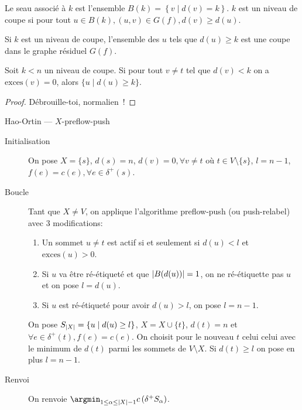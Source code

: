 \documentclass[math, info]{cours}
\begin{document}
\begin{definition}
	Le seau associé à $k$ est l'ensemble $B(k) = \left\{v \mid d(v) = k\right\}$.
	$k$ est un niveau de coupe si pour tout $u \in B(k), (u, v) \in G(f), d(v) \geq d(u)$.
	\label{def:bucketlevel}
\end{definition}

\begin{proposition}
	Si $k$ est un niveau de coupe, l'ensemble des $u$ tels que $d(u) \geq k$ est une coupe dans le graphe résiduel $G(f)$.
	\label{prop:cutleveliscut}
\end{proposition}

\begin{proposition}
	Soit $k < n$ un niveau de coupe. Si pour tout $v \neq t$ tel que $d(v) < k$ on a $\mathrm{exces}(v) = 0$, alors $\{u \mid d(u) \geq k\}$.
	\label{prop:cutlevelexcess}
\end{proposition}
\begin{proof}
	Débrouille-toi, normalien~!
\end{proof}

\begin{algorithm}
	\caption{Hao-Ortin --- $X$-preflow-push}
	\begin{description}
		\item[Initialisation] On pose $X = \{s\}$, $d(s) = n$, $d(v) = 0, \forall v \neq t$ où $t \in V \setminus\{s\}$,
			$l = n - 1$, $f(e) = c(e), \forall e \in \delta^{+}(s)$.
		\item[Boucle] Tant que $X \neq V$, on applique l'algorithme preflow-push (ou push-relabel) avec 3 modifications:
			\begin{enumerate}
				\item Un sommet $u \neq t$ est actif si et seulement si $d(u) < l$ et $\mathrm{exces}(u) > 0$.
				\item Si $u$ va être ré-étiqueté et que $\left|B(d(u))\right| = 1$, on ne ré-étiquette pas $u$ et on pose $l = d(u)$.
				\item Si $u$ est ré-étiqueté pour avoir $d(u) > l$, on pose $l = n - 1$.
			\end{enumerate}
			On pose $S_{\left|X\right|} = \left\{u \mid d(u) \geq l\right\}$, $X = X \cup \{t\}$, $d(t) = n$ et $\forall e \in \delta^{+}(t), f(e) = c(e)$.
			On choisit pour le nouveau $t$ celui celui avec le minimum de $d(t)$ parmi les sommets de $V \setminus X$.
			Si $d(t) \geq l$ on pose en plus $l = n - 1$.
		\item[Renvoi] On renvoie $\argmin_{1 \leq \alpha \leq \abs{X} - 1} c\left(\delta^{+}S_{\alpha} \right)$.
	\end{description}
	\label{alg:haoortin}
\end{algorithm}
\end{document}
